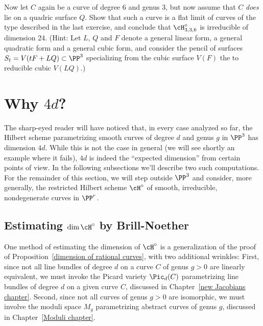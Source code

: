 \begin{exercise}
Now let $C$ again be a curve of degree 6 and genus 3, but now assume that $C$ \emph{does} lie on a quadric surface $Q$. Show that such a curve is a flat limit of curves of the type described in the last exercise, and conclude that $\cH^\circ_{3,3,6}$ is irreducible of dimension 24. (Hint: Let $L$, $Q$ and $F$ denote a general linear form, a general quadratic form and a general cubic form, and consider the pencil of surfaces $S_t = V(tF + LQ) \subset \PP^3$ specializing from the cubic surface $V(F)$ the to reducible cubic $V(LQ)$.)

\end{exercise}



\section{Why  $4d$?}\label{estimating dim hilb}

The sharp-eyed reader will have noticed that, in every case analyzed so far,  the Hilbert scheme parametrizing smooth curves of degree $d$ and genus $g$ in $\PP^3$ has dimension $4d$. While this is not the case in general (we will see shortly an example where it fails), $4d$ is indeed the ``expected dimension'' from certain points of view. In the following subsections we'll describe two such computations. For the remainder of this section, we will step outside $\PP^3$ and consider, more generally, the restricted Hilbert scheme $\cH^\circ$ of smooth, irreducible, nondegenerate curves in $\PP^r$.

\subsection{Estimating $\dim \cH^\circ$ by Brill-Noether}

One method of estimating  the dimension of $\cH^\circ$ is a generalization of the proof of Proposition~\ref{dimension of rational curves}, with two additional wrinkles: First, since not all line bundles of degree $d$ on a curve $C$ of genus $g > 0$ are linearly equivalent, we must invoke the Picard variety $\Pic_d(C)$ parametrizing line bundles of degree $d$ on a given curve $C$, discussed in Chapter~\ref{new Jacobians chapter}. Second, since not all curves of genus $g > 0$ are isomorphic, we must involve the moduli space  $M_g$ parametrizing abstract curves of genus $g$, discussed in Chapter~\ref{Moduli chapter}.


